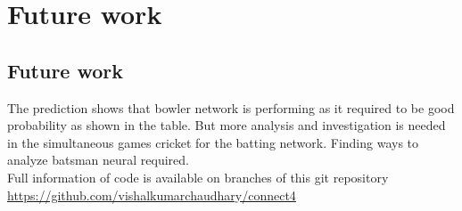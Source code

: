 \chapter{Future work}

\section{Future work}
The prediction shows that bowler network is performing as it required to be good probability as shown in the table. But more analysis and investigation is needed in the simultaneous games cricket for the batting network. Finding ways to analyze batsman neural required.\\
Full information of code is available on branches of this git repository\\
\url{https://github.com/vishalkumarchaudhary/connect4}
